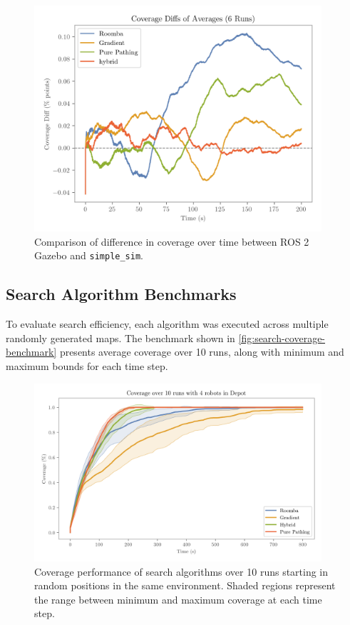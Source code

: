\begin{figure}[H]
    \begin{center}
        \includegraphics[width=0.95\textwidth]{./figures/plots/consistency/coverage-diffs-of-averages-(6-runs).png}
    \end{center}
    \caption{Comparison of difference in coverage over time between ROS 2 Gazebo and \texttt{simple\_sim}.}
    \label{fig:coverage-benchmark-diff}
\end{figure}

\subsection{Search Algorithm Benchmarks}
To evaluate search efficiency, each algorithm was executed across multiple randomly generated maps. The benchmark shown in \cref{fig:search-coverage-benchmark} presents average coverage over 10 runs, along with minimum and maximum bounds for each time step.

\begin{figure}[H]
    \begin{center}
        \includegraphics[width=0.95\textwidth]{./figures/plots/benchmarks/coverage-over-10-runs-with-4-robots-in-depot.png}
    \end{center}
    \caption{Coverage performance of search algorithms over 10 runs starting in random positions in the same environment. Shaded regions represent the range between minimum and maximum coverage at each time step.}
    \label{fig:coverage-benchmark}
\end{figure}

